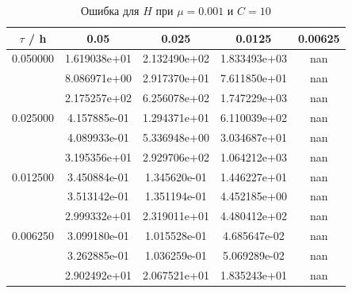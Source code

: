 \documentclass[specialist,subf,href,colorlinks=true,12pt
,times,mtpro,specialist
]{disser}
\begin{document}
\begin{table}[H]
\small
\caption{Ошибка для $H$ при $\mu=0.001$ и $C = 10$}
\begin{center}
\begin{tabular}{|c|c|c|c|c|}
\hline
$\tau$ / h & 0.05 & 0.025 & 0.0125 & 0.00625 \\
\hline
0.050000 & 1.619038e+01  & 2.132490e+02  & 1.833493e+03  & nan \\
 & 8.086971e+00  & 2.917370e+01  & 7.611850e+01  & nan \\
 & 2.175257e+02  & 6.256078e+02  & 1.747229e+03  & nan \\
\hline
0.025000 & 4.157885e-01  & 1.294371e+01  & 6.110039e+02  & nan \\
 & 4.089933e-01  & 5.336948e+00  & 3.034687e+01  & nan \\
 & 3.195356e+01  & 2.929706e+02  & 1.064212e+03  & nan \\
\hline
0.012500 & 3.450884e-01  & 1.345620e-01  & 1.446227e+01  & nan \\
 & 3.513142e-01  & 1.351194e-01  & 4.452185e+00  & nan \\
 & 2.999332e+01  & 2.319011e+01  & 4.480412e+02  & nan \\
\hline
0.006250 & 3.099180e-01  & 1.015528e-01  & 4.685647e-02  & nan \\
 & 3.262885e-01  & 1.036259e-01  & 5.069289e-02  & nan \\
 & 2.902492e+01  & 2.067521e+01  & 1.835243e+01  & nan \\
\hline
\end{tabular}
\end{center}
\end{table}
\end{document}
